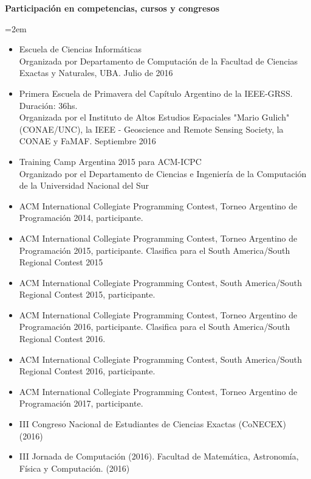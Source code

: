 \documentclass[paper=a4,fontsize=11pt]{scrartcl} %
\newcommand{\sepspace}{\vspace*{1em}}		%
\newcommand{\EducationEntry}[4]{
		\noindent \textbf{#1} \hfill      %
		\colorbox{White}{%
			\parbox{5cm}{%
			\hfill\color{Black}#2}} \par  %
		\noindent \textit{#3} \par        %
		\noindent\hangindent=2em\hangafter=0 \small #4 %
		\normalsize \par}
\begin{document}
\sepspace

\EducationEntry{Participación en competencias, cursos y congresos}{}{}{
\begin{itemize}

\item{Escuela de Ciencias Informáticas\\}{Organizada por Departamento de Computación de la Facultad de Ciencias Exactas y Naturales, UBA. Julio de 2016}

\item{Primera Escuela de Primavera del Capítulo Argentino de la IEEE-GRSS. Duración: 36hs. \\}{Organizada por el Instituto de Altos Estudios Espaciales "Mario Gulich" (CONAE/UNC), la IEEE - Geoscience and Remote Sensing Society, la CONAE y FaMAF. Septiembre 2016}

\item{Training Camp Argentina 2015 para ACM-ICPC}{\\Organizado por el Departamento de Ciencias e Ingeniería de la Computación de la Universidad Nacional del Sur}

\item{ACM International Collegiate Programming Contest, Torneo Argentino de Programación 2014, participante.}{}

\item{ACM International Collegiate Programming Contest, Torneo Argentino de Programación 2015, participante. Clasifica para el South America/South Regional Contest 2015}{}

\item{ACM International Collegiate Programming Contest, South America/South Regional Contest 2015, participante.}{}

\item{ACM International Collegiate Programming Contest, Torneo Argentino de Programación 2016, participante. Clasifica para el South America/South Regional Contest 2016.}{}

\item{ACM International Collegiate Programming Contest, South America/South Regional Contest 2016, participante.}{}

\item{ACM International Collegiate Programming Contest, Torneo Argentino de Programación 2017, participante.}{}

\item{III Congreso Nacional de Estudiantes de Ciencias Exactas (CoNECEX)}{ (2016)}

\item{III Jornada de Computación (2016). Facultad de Matemática, Astronomía, Física y Computación.}{ (2016)}

\end{itemize}
}
\end{document}
